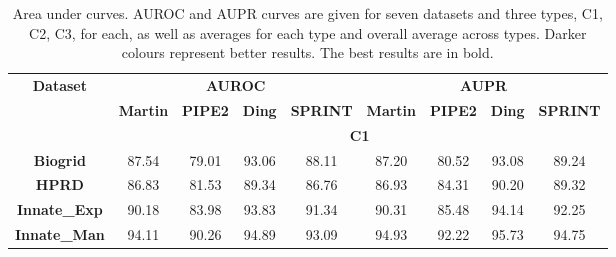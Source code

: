 \begin{table}[] 
\caption[Area under curves]{Area under curves. AUROC and AUPR curves are given for seven datasets and three types, C1, C2, C3, for each, as well as averages for each type and overall average across types. Darker colours represent better results. The best results are in bold. \label{table_AUC}} 
    \begin{tabular}{|c|cccc|cccc|}
    \toprule
    \multirow{3}[6]{*}{\textbf{Dataset}} & \multicolumn{4}{c|}{\textbf{AUROC}} & \multicolumn{4}{c|}{\textbf{AUPR}} \\
\cmidrule{2-9}          & \textbf{$\!\!\!$Martin$\!\!\!$} & \textbf{$\!\!\!$PIPE2$\!\!\!$} & \textbf{$\!\!\!$Ding$\!\!\!$} & \textbf{$\!\!\!$SPRINT$\!\!\!$} & \textbf{$\!\!\!$Martin$\!\!\!$} & \textbf{$\!\!\!$PIPE2$\!\!\!$} & \textbf{$\!\!\!$Ding$\!\!\!$} & \textbf{$\!\!\!$SPRINT$\!\!\!$} \\
\cmidrule{2-9}          & \multicolumn{8}{c|}{\textbf{C1}} \\
    \midrule
    \textbf{Biogrid} & \cellcolor[rgb]{ .549,  .678,  .463} 87.54 & \cellcolor[rgb]{ .886,  .937,  .855} 79.01 & \cellcolor[rgb]{ .329,  .51,  .208} 93.06 & \cellcolor[rgb]{ .529,  .663,  .439} 88.11 & \cellcolor[rgb]{ .592,  .714,  .514} 87.20 & \cellcolor[rgb]{ .886,  .937,  .855} 80.52 & \cellcolor[rgb]{ .329,  .51,  .208} 93.08 & \cellcolor[rgb]{ .502,  .643,  .408} 89.24 \\
    \textbf{HPRD} & \cellcolor[rgb]{ .51,  .651,  .42} 86.83 & \cellcolor[rgb]{ .886,  .937,  .855} 81.53 & \cellcolor[rgb]{ .329,  .51,  .208} 89.34 & \cellcolor[rgb]{ .514,  .655,  .424} 86.76 & \cellcolor[rgb]{ .639,  .749,  .569} 86.93 & \cellcolor[rgb]{ .886,  .937,  .855} 84.31 & \cellcolor[rgb]{ .329,  .51,  .208} 90.20 & \cellcolor[rgb]{ .416,  .576,  .306} 89.32 \\
    \textbf{Innate\_Exp} & \cellcolor[rgb]{ .537,  .671,  .451} 90.18 & \cellcolor[rgb]{ .886,  .937,  .855} 83.98 & \cellcolor[rgb]{ .329,  .51,  .208} 93.83 & \cellcolor[rgb]{ .471,  .62,  .373} 91.34 & \cellcolor[rgb]{ .576,  .702,  .494} 90.31 & \cellcolor[rgb]{ .886,  .937,  .855} 85.48 & \cellcolor[rgb]{ .329,  .51,  .208} 94.14 & \cellcolor[rgb]{ .455,  .604,  .353} 92.25 \\
    \textbf{Innate\_Man} & \cellcolor[rgb]{ .424,  .584,  .318} 94.11 & \cellcolor[rgb]{ .886,  .937,  .855} 90.26 & \cellcolor[rgb]{ .329,  .51,  .208} 94.89 & \cellcolor[rgb]{ .549,  .678,  .463} 93.09 & \cellcolor[rgb]{ .459,  .608,  .357} 94.93 & \cellcolor[rgb]{ .886,  .937,  .855} 92.22 & \cellcolor[rgb]{ .329,  .51,  .208} 95.73 & \cellcolor[rgb]{ .486,  .631,  .392} 94.75 \\

\end{tabular}
\end{table}
